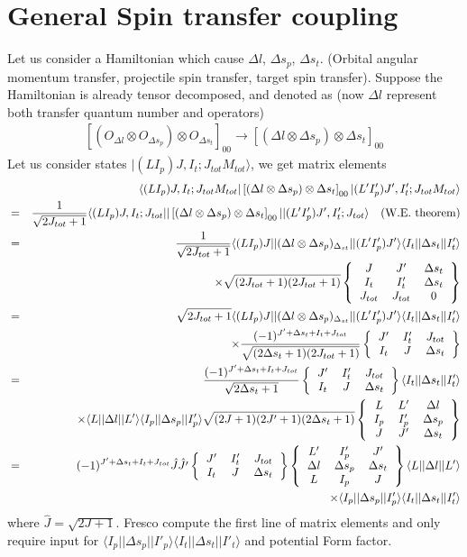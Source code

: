 \documentclass[11pt]{book}
\def\la{\langle}
\def\ra{\rangle}
\newcommand{\bea}{\begin{eqnarray}}
\newcommand{\eea}{\end{eqnarray}}
\newcommand{\no}{\nonumber \\}
\newcommand{\sixjsymbol}[6]{\left\{\begin{tabular}{ccc} {$#1$}&{$#2$}&{$#3$}\\
                             {$#4$}&{$#5$}&{$#6$} \end{tabular}\right\}}
\newcommand{\ninejsymbol}[9]{\left\{\begin{tabular}{ccc}
                             {$#1$}&{$#2$}&{$#3$}\\
                             {$#4$}&{$#5$}&{$#6$}\\
                             {$#7$}&{$#8$}&{$#9$}\end{tabular}\right\}}
\begin{document}
\section{General Spin transfer coupling}
Let us consider a Hamiltonian which cause $\Delta l$, $\Delta s_p$, $\Delta s_t$.
(Orbital angular momentum transfer, projectile spin transfer, target spin transfer). 
Suppose the Hamiltonian is already tensor decomposed, and denoted as (now $\Delta l$ represent 
both transfer quantum number and operators)
\bea 
\left[(O_{\Delta l}\otimes O_{\Delta s_p})\otimes O_{\Delta s_t}\right]_{00}
\to \left[ (\Delta l \otimes \Delta s_p)\otimes \Delta s_t\right]_{00} 
\eea 
Let us consider states $|(L I_p)J,I_t;J_{tot} M_{tot}\ra$, we get matrix elements 
\bea 
& &\la (L I_p)J,I_t;J_{tot} M_{tot}| \left[ (\Delta l \otimes \Delta s_p)\otimes \Delta s_t\right]_{00}
  |(L' I'_p)J',I'_t;J_{tot} M_{tot}\ra \no 
&=&   \frac{1}{\sqrt{2J_{tot}+1}} 
     \la (L I_p)J,I_t;J_{tot}||\left[ (\Delta l \otimes \Delta s_p)\otimes \Delta s_t\right]_{00}
     ||(L' I'_p)J',I'_t;J_{tot}\ra  \quad \mbox{(W.E. theorem)} \no 
&=& \frac{1}{\sqrt{2J_{tot}+1}} 
    \la (L I_p) J|| (\Delta l \otimes \Delta s_p)_{\Delta_{st}}||(L' I'_p)J'\ra 
         \la I_t|| \Delta s_t || I'_t\ra \no 
     & &\times \sqrt{(2J_{tot}+1)(2J_{tot}+1)}
       \ninejsymbol{J}{J'}{\Delta s_t}{I_t}{I'_t}{\Delta s_t}{J_{tot}}{J_{tot}}{0}    \no 
&=&  \sqrt{2J_{tot}+1}      \la (L I_p) J|| (\Delta l \otimes \Delta s_p)_{\Delta_{st}}||(L' I'_p)J'\ra 
\la I_t|| \Delta s_t || I'_t\ra \no & &\times 
  \frac{(-1)^{J'+\Delta s_t+I_t+J_{tot}}}{\sqrt{(2\Delta s_t+1)(2J_{tot}+1)  } }
  \sixjsymbol{J'}{I'_t}{J_{tot}}{I_t}{J}{\Delta s_t}	\no 
&=&  \frac{(-1)^{J'+\Delta s_t+I_t+J_{tot}}}{\sqrt{2\Delta s_t+1 } }
    \sixjsymbol{J'}{I'_t}{J_{tot}}{I_t}{J}{\Delta s_t} \la I_t|| \Delta s_t || I'_t\ra \no 
    & &\times 
    \la L||\Delta l||L'\ra \la I_p||\Delta s_p||I'_p\ra 
    \sqrt{(2J+1)(2J'+1)(2\Delta s_t+1)}
    \ninejsymbol{L}{L'}{\Delta l}{I_p}{I'_p}{\Delta s_p}{J}{J'}{\Delta s_t} \no 
&=& (-1)^{J'+\Delta s_t+I_t+J_{tot}} \hat{J}\hat{J'}
    \sixjsymbol{J'}{I'_t}{J_{tot}}{I_t}{J}{\Delta s_t} 
    \ninejsymbol{L'}{I'_p}{J'}{\Delta l}{\Delta s_p}{\Delta s_t}{L}{I_p}{J} 
    \la L||\Delta l||L'\ra
    \no & &\times 
     \la I_p||\Delta s_p||I'_p\ra
    \la I_t|| \Delta s_t || I'_t\ra
\eea 
where $\hat{J}=\sqrt{2J+1}$.
Fresco compute the first line of matrix elements and only require input for 
$\la I_p||\Delta s_p||I'_p\ra \la I_t|| \Delta s_t || I'_t\ra$ and potential 
Form factor. 
\end{document}
